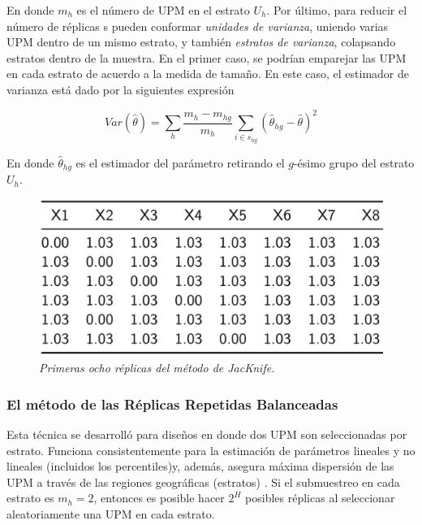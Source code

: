 \documentclass[
  10pt,
  spanish,
]{book}
\begin{document}
En donde \(m_h\) es el número de UPM en el estrato \(U_h\). Por último, para reducir el número de réplicas s pueden conformar \emph{unidades de varianza}, uniendo varias UPM dentro de un mismo estrato, y también \emph{estratos de varianza}, colapsando estratos dentro de la muestra. En el primer caso, se podrían emparejar las UPM en cada estrato de acuerdo a la medida de tamaño. En este caso, el estimador de varianza está dado por la siguientes expresión

\[
Var(\hat{\theta}) = \sum_h \frac{m_h-m_{hg}}{m_h} 
\sum_{i \in s_{hg}} (\hat{\theta}_{hg} - \hat{\theta})^2
\]

En donde \(\hat{\theta}_{hg}\) es el estimador del parámetro retirando el \(g\)-ésimo grupo del estrato \(U_h\).

\begin{figure}
\centering
\includegraphics{Pics/20.png}
\caption{\emph{Primeras ocho réplicas del método de JacKnife.}}
\end{figure}

\hypertarget{el-muxe9todo-de-las-ruxe9plicas-repetidas-balanceadas}{%
\subsubsection*{El método de las Réplicas Repetidas Balanceadas}\label{el-muxe9todo-de-las-ruxe9plicas-repetidas-balanceadas}}

Esta técnica se desarrolló para diseños en donde dos UPM son seleccionadas por estrato. Funciona consistentemente para la estimación de parámetros lineales y no lineales (incluidos los percentiles)y, además, asegura máxima dispersión de las UPM a través de las regiones geográficas (estratos) \citep{Valliant_Dever_2017}. Si el submuestreo en cada estrato es \(m_h = 2\), entonces es posible hacer \(2^H\) posibles réplicas al seleccionar aleatoriamente una UPM en cada estrato.
\end{document}
